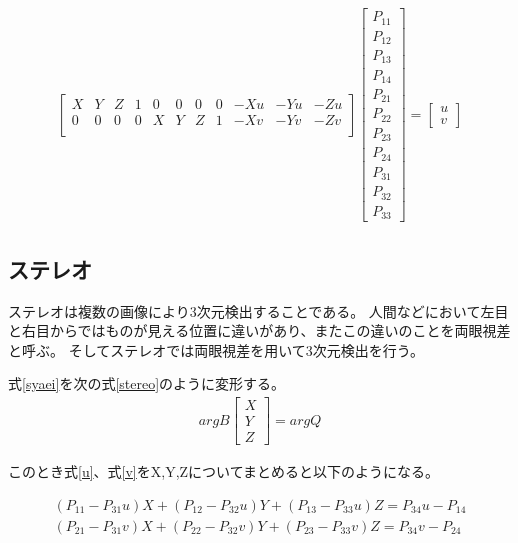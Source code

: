 \documentclass[11pt,a4j]{jsarticle}
\begin{document}
\begin{align}
  \left[
    \begin{array}{ccccccccccc}
      X & Y & Z & 1 & 0 & 0 & 0 & 0 & -Xu & -Yu & -Zu \\
      0 & 0 & 0 & 0 & X & Y & Z & 1 & -Xv & -Yv & -Zv \\
    \end{array}
  \right]
  \left[
    \begin{array}{c}
      P_{11} \\ P_{12} \\ P_{13} \\ P_{14} \\
      P_{21} \\ P_{22} \\ P_{23} \\ P_{24} \\
      P_{31} \\ P_{32} \\ P_{33}
    \end{array}
  \right]
  =
  \left[
    \begin{array}{c}
      u \\ v
    \end{array}
  \right]
  \label{camera}
\end{align}

\subsection{ステレオ}
\label{sub:ステレオ}
ステレオは複数の画像により3次元検出することである。
人間などにおいて左目と右目からではものが見える位置に違いがあり、またこの違いのことを両眼視差と呼ぶ。
そしてステレオでは両眼視差を用いて3次元検出を行う。

式\ref{syaei}を次の式\ref{stereo}のように変形する。
\begin{align}
  argB
  \left[
    \begin{array}{c}
      X \\ Y \\ Z
    \end{array}
  \right]
  = argQ
  \label{stereo}
\end{align}

このとき式\ref{u}、式\ref{v}をX,Y,Zについてまとめると以下のようになる。

\begin{align}
  (P_{11} - P_{31}u)X + (P_{12} - P_{32}u)Y + (P_{13} - P_{33}u)Z = P_{34}u - P_{14}
  \label{u3} \\
  (P_{21} - P_{31}v)X + (P_{22} - P_{32}v)Y + (P_{23} - P_{33}v)Z = P_{34}v - P_{24}
  \label{v3}
\end{align}
\end{document}
